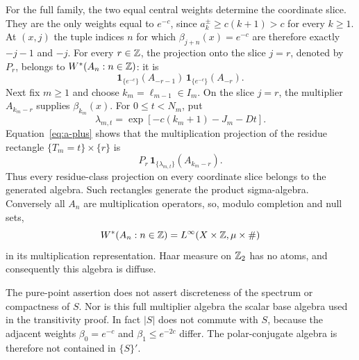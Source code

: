 For the full family, the two equal central weights determine the
coordinate slice. They are the only weights equal to $e^{-c}$, since
$a_k^\pm\ge c(k+1)>c$ for every $k\ge1$. At $(x,j)$ the tuple indices
$n$ for which $\beta_{j+n}(x)=e^{-c}$ are therefore exactly
$-j-1$ and $-j$. For every $r\in\mathbb Z$, the projection onto the slice
$j=r$, denoted by $P_r$, belongs to $W^*(A_n:n\in\mathbb Z)$: it is
\[
 \mathbf1_{\{e^{-c}\}}(A_{-r-1})\,
 \mathbf1_{\{e^{-c}\}}(A_{-r}).
\]
Next fix $m\ge1$ and choose $k_m=\ell_{m-1}\in I_m$. On the slice
$j=r$, the multiplier $A_{k_m-r}$ supplies $\beta_{k_m}(x)$.
For $0\le t<N_m$, put
\[
 \lambda_{m,t}=\exp[-c(k_m+1)-J_m-Dt].
\]
Equation~\eqref{eq:a-plus} shows that the multiplication projection
of the residue rectangle $\{T_m=t\}\times\{r\}$ is
\[
 P_r\,\mathbf1_{\{\lambda_{m,t}\}}(A_{k_m-r}).
\]
Thus every residue-class projection on every coordinate slice belongs
to the generated algebra. Such rectangles generate the product
sigma-algebra. Conversely all $A_n$ are multiplication operators, so,
modulo completion and null sets,
\[
 W^*(A_n:n\in\mathbb Z)
   =L^\infty(X\times\mathbb Z,\mu\times\#)
\]
in its multiplication representation. Haar measure on $\mathbb Z_2$ has no
atoms, and consequently this algebra is diffuse.

The pure-point assertion does not assert discreteness of the spectrum
or compactness of $S$. Nor is this full multiplier algebra the scalar
base algebra used in the transitivity proof. In fact $|S|$ does not
commute with $S$, because the adjacent weights $\beta_0=e^{-c}$ and
$\beta_1\le e^{-2c}$ differ. The polar-conjugate algebra is therefore
not contained in $\{S\}'$.
